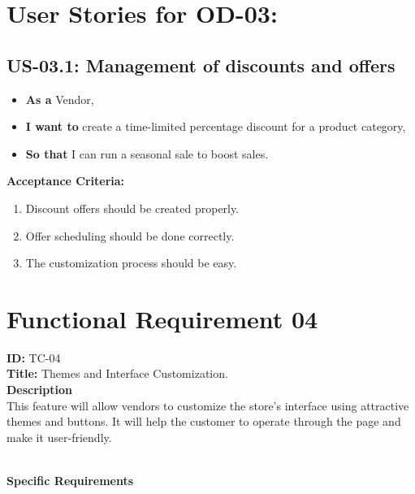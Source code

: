 \section*{User Stories for OD-03: }

\subsection*{US-03.1: Management of discounts and offers}
\begin{itemize}
    \item \textbf{As a} Vendor,
    \item \textbf{I want to} create a time-limited percentage discount for a product category,
    \item \textbf{So that} I can run a seasonal sale to boost sales.
\end{itemize}


\noindent\textbf{Acceptance Criteria:}
\begin{enumerate}
    \item Discount offers should be created properly.
    \item Offer scheduling should be done correctly.
    \item The customization process should be easy.
\end{enumerate}
\section{Functional Requirement 04}

\textbf{ID:} TC-04 \\
\textbf{Title:} Themes and Interface Customization.\\
\textbf{Description}\\
This feature will allow vendors to customize the store’s interface using attractive themes and buttons. It will help the customer to operate through the page and make it user-friendly.

\\
\textbf{Specific Requirements}

